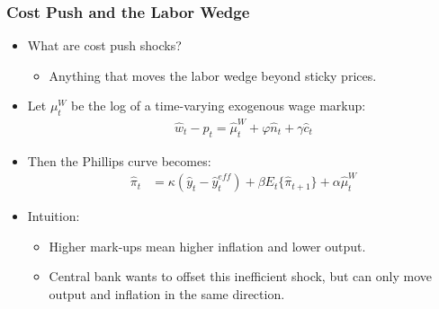 \documentclass[11pt,aspectratio=169,xcolor={dvipsnames},hyperref={pdftex,pdfpagemode=UseNone,hidelinks,pdfdisplaydoctitle=true},usepdftitle=false]{beamer}
\begin{document}
\begin{frame}
\frametitle{Cost Push and the Labor Wedge}
\begin{itemize}
	\item What are cost push shocks?
	\begin{itemize}
		\item Anything that moves the labor wedge beyond sticky prices.
	\end{itemize}
	\item Let $\mu_t^W$ be the log of a time-varying exogenous wage markup:
	\begin{align*}
		\hat{w}_t-\hat{p}_t=\hat{\mu}^W_t+\varphi \hat{n}_t+\gamma \hat{c}_t
	\end{align*}
	\item Then the Phillips curve becomes:
	\begin{align*}
		\hat{\pi}_t&=\kappa (\hat{y}_t - \hat{y}_t^{eff}) +\beta E_t \{\hat{\pi}_{t+1}\} +\alpha \hat{\mu}^W_t
	\end{align*}
	\item Intuition: 
	\begin{itemize}
		\item Higher mark-ups mean higher inflation and lower output.
		\item Central bank wants to offset this inefficient shock, but can only move output and inflation in the same direction.
	\end{itemize}
\end{itemize}
\end{frame}
\end{document}
